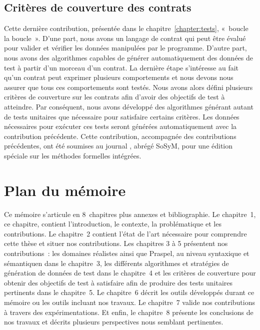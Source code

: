 \subsection{Critères de couverture des contrats}

Cette dernière contribution, présentée dans le chapitre~\ref{chapter:tests},
«~boucle la boucle~». D'une part, nous avons un langage de contrat qui peut être
évalué pour valider et vérifier les données manipulées par le programme. D'autre
part, nous avons des algorithmes capables de générer automatiquement des données
de test à partir d'un morceau d'un contrat. La dernière étape s'intéresse au
fait qu'un contrat peut exprimer plusieurs comportements et nous devons nous
assurer que tous ces comportements sont testés. Nous avons alors défini
plusieurs critères de couverture sur les contrats afin d'avoir des objectifs de
test à atteindre.  Par conséquent, nous avons développé des algorithmes générant
autant de tests unitaires que nécessaire pour satisfaire certains critères. Les
données nécessaires pour exécuter ces tests seront générées automatiquement avec
la contribution précédente. Cette contribution, accompagnée des contributions
précédentes, ont été soumises au journal , abrégé SoSyM, pour une édition spéciale sur les méthodes formelles
intégrées.

\section{Plan du mémoire}

Ce mémoire s'articule en 8~chapitres plus annexes et bibliographie.  Le
chapitre~1, ce chapitre, contient l'introduction, le contexte, la problématique
et les contributions. Le chapitre~2 contient l'état de l'art nécessaire pour
comprendre cette thèse et situer nos contributions. Les chapitres 3 à 5
présentent nos contributions~: les domaines réalistes ainsi que Praspel, au
niveau syntaxique et sémantiquen dans le chapitre~3, les différents algorithmes
et stratégies de génération de données de test dans le chapitre~4 et les
critères de couverture pour obtenir des objectifs de test à satisfaire afin de
produire des tests unitaires pertinents dans le chapitre~5. Le chapitre~6 décrit
les outils développés durant ce mémoire ou les outils incluant nos travaux. Le
chapitre~7 valide nos contributions à travers des expérimentations. Et enfin, le
chapitre~8 présente les conclusions de nos travaux et décrits plusieurs
perspectives nous semblant pertinentes.
